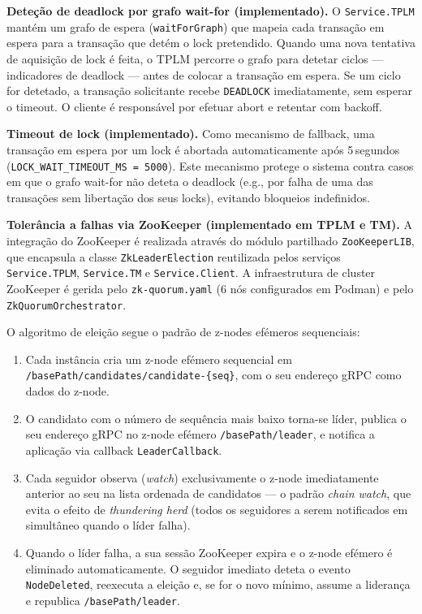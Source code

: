 \textbf{Deteção de deadlock por grafo wait-for (implementado).}
O \texttt{Service.TPLM} mantém um grafo de espera (\texttt{waitForGraph}) que mapeia cada
transação em espera para a transação que detém o lock pretendido. Quando uma nova tentativa de
aquisição de lock é feita, o TPLM percorre o grafo para detetar ciclos --- indicadores de
deadlock --- antes de colocar a transação em espera. Se um ciclo for detetado, a transação
solicitante recebe \texttt{DEADLOCK} imediatamente, sem esperar o timeout. O cliente é
responsável por efetuar abort e retentar com backoff.

\textbf{Timeout de lock (implementado).}
Como mecanismo de fallback, uma transação em espera por um lock é abortada automaticamente
após 5\,segundos (\texttt{LOCK\_WAIT\_TIMEOUT\_MS = 5000}). Este mecanismo protege o sistema
contra casos em que o grafo wait-for não deteta o deadlock (e.g., por falha de uma das
transações sem libertação dos seus locks), evitando bloqueios indefinidos.

\textbf{Tolerância a falhas via ZooKeeper (implementado em TPLM e TM).}
A integração do ZooKeeper é realizada através do módulo partilhado \texttt{ZooKeeperLIB},
que encapsula a classe \texttt{ZkLeaderElection} reutilizada pelos serviços
\texttt{Service.TPLM}, \texttt{Service.TM} e \texttt{Service.Client}. A infraestrutura de
cluster ZooKeeper é gerida pelo \texttt{zk-quorum.yaml} (6 nós configurados em Podman) e
pelo \texttt{ZkQuorumOrchestrator}.

O algoritmo de eleição segue o padrão de z-nodes efémeros sequenciais:

\begin{enumerate}[label=\arabic*.]
  \item Cada instância cria um z-node efémero sequencial em
        \texttt{/basePath/candidates/candidate-\{seq\}}, com o seu endereço gRPC como
        dados do z-node.
  \item O candidato com o número de sequência mais baixo torna-se líder, publica o seu
        endereço gRPC no z-node efémero \texttt{/basePath/leader}, e notifica a aplicação
        via callback \texttt{LeaderCallback}.
  \item Cada seguidor observa (\textit{watch}) exclusivamente o z-node imediatamente
        anterior ao seu na lista ordenada de candidatos --- o padrão
        \textit{chain watch}, que evita o efeito de \textit{thundering herd} (todos os
        seguidores a serem notificados em simultâneo quando o líder falha).
  \item Quando o líder falha, a sua sessão ZooKeeper expira e o z-node efémero é
        eliminado automaticamente. O seguidor imediato deteta o evento
        \texttt{NodeDeleted}, reexecuta a eleição e, se for o novo mínimo, assume a
        liderança e republica \texttt{/basePath/leader}.
\end{enumerate}

